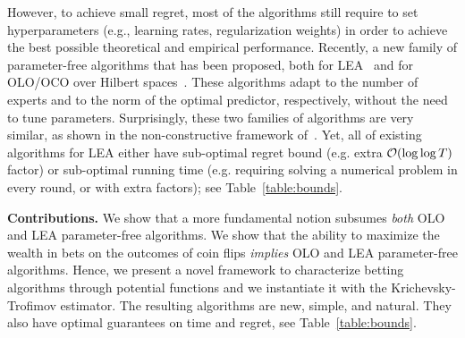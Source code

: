 However, to achieve small regret, most of the algorithms still require to set
hyperparameters (e.g., learning rates, regularization weights) in order to
achieve the best possible theoretical and empirical performance.  Recently, a
new family of parameter-free algorithms that has been proposed, both for
\ac{LEA}~\cite{Chaudhuri-Freund-Hsu-2009, Chernov-Vovk-2010, Luo-Schapire-2014,
Luo-Schapire-2015, Koolen-van-Erven-2015} and for \ac{OLO}/\ac{OCO} over
Hilbert spaces~\cite{Streeter-McMahan-2012, Orabona-2013,
McMahan-Abernethy-2013, McMahan-Orabona-2014, Orabona-2014}.  These algorithms
adapt to the number of experts and to the norm of the optimal predictor,
respectively, without the need to tune parameters.  Surprisingly, these two
families of algorithms are very similar, as shown in the non-constructive
framework of~\cite{Foster-Rakhlin-Sridharan-2015}.
Yet, all of existing
algorithms for LEA either have sub-optimal regret bound (e.g. extra $\mathcal{O}(\log
\log T)$ factor) or sub-optimal running time (e.g. requiring solving a
numerical problem in every round, or with extra factors); see
Table~\ref{table:bounds}.

\textbf{Contributions.} We show that a more fundamental notion subsumes \emph{both}
\ac{OLO} and \ac{LEA} parameter-free algorithms. We show that the ability to
maximize the wealth in bets on the outcomes of coin flips \emph{implies}
\ac{OLO} and \ac{LEA} parameter-free algorithms.  Hence, we present a novel
framework to characterize betting algorithms through potential functions and we
instantiate it with the Krichevsky-Trofimov estimator.  The resulting
algorithms are new, simple, and natural. They also have optimal guarantees on
time and regret, see Table~\ref{table:bounds}.

